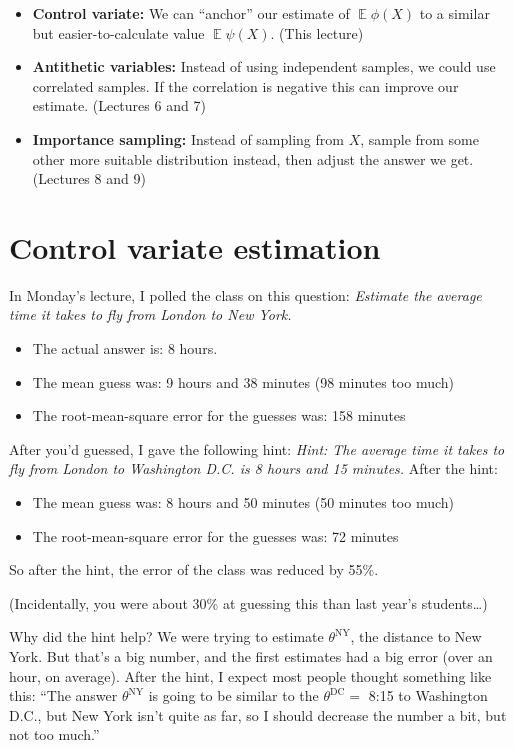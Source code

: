 \documentclass[
  letterpaper,
  DIV=11,
  numbers=noendperiod]{scrreprt}
\newcommand{\Exg}{\operatorname{\mathbb{E}}}
\theoremstyle{plain}
\theoremstyle{definition}
\theoremstyle{definition}
\theoremstyle{remark}
\begin{document}
\begin{itemize}
\item
  \textbf{Control variate:} We can ``anchor'' our estimate of
  \(\Exg \phi(X)\) to a similar but easier-to-calculate value
  \(\Exg \psi(X)\). (This lecture)
\item
  \textbf{Antithetic variables:} Instead of using independent samples,
  we could use correlated samples. If the correlation is negative this
  can improve our estimate. (Lectures 6 and 7)
\item
  \textbf{Importance sampling:} Instead of sampling from \(X\), sample
  from some other more suitable distribution instead, then adjust the
  answer we get. (Lectures 8 and 9)
\end{itemize}

\section{Control variate estimation}\label{control-variate-estimation}

In Monday's lecture, I polled the class on this question: \emph{Estimate
the average time it takes to fly from London to New York.}

\begin{itemize}
\item
  The actual answer is: 8 hours.
\item
  The mean guess was: 9 hours and 38 minutes (98 minutes too much)
\item
  The root-mean-square error for the guesses was: 158 minutes
\end{itemize}

After you'd guessed, I gave the following hint: \emph{Hint: The average
time it takes to fly from London to Washington D.C. is 8 hours and 15
minutes.} After the hint:

\begin{itemize}
\item
  The mean guess was: 8 hours and 50 minutes (50 minutes too much)
\item
  The root-mean-square error for the guesses was: 72 minutes
\end{itemize}

So after the hint, the error of the class was reduced by 55\%.

(Incidentally, you were about 30\% at guessing this than last year's
students\ldots)

Why did the hint help? We were trying to estimate
\(\theta^{\mathrm{NY}}\), the distance to New York. But that's a big
number, and the first estimates had a big error (over an hour, on
average). After the hint, I expect most people thought something like
this: ``The answer \(\theta^{\mathrm{NY}}\) is going to be similar to
the \(\theta^{\mathrm{DC}} =\) 8:15 to Washington D.C., but New York
isn't quite as far, so I should decrease the number a bit, but not too
much.''
\end{document}
